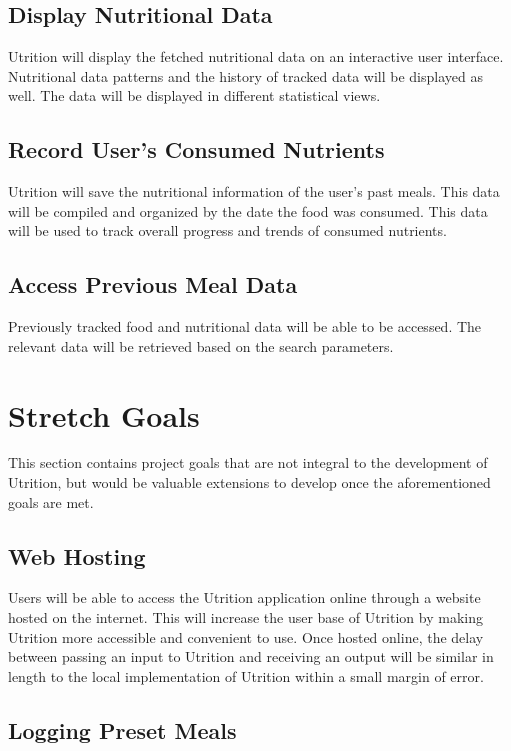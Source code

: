 \documentclass{article}
\begin{document}
\subsection{Display Nutritional Data}

Utrition will display the fetched nutritional data on an interactive user 
interface. Nutritional data patterns and the history of tracked data will be 
displayed as well. The data will be displayed in different statistical views.

\subsection{Record User's Consumed Nutrients}

Utrition will save the nutritional information of the user's past meals. This 
data will be compiled and organized by the date the food was consumed. This 
data will be used to track overall progress and trends of consumed nutrients.

\subsection{Access Previous Meal Data}

Previously tracked food and nutritional data will be able to be accessed. The 
relevant data will be retrieved based on the search parameters.

\section{Stretch Goals}

This section contains project goals that are not integral to the development of Utrition, but would be valuable extensions to develop once the aforementioned goals are met.

\subsection{Web Hosting}

Users will be able to access the Utrition application online through a website hosted on the internet. This will increase the user base of Utrition by making Utrition more accessible and convenient to use. Once hosted online, the delay between passing an input to Utrition and receiving an output will be similar in length to the local implementation of Utrition within a small margin of error.

\subsection{Logging Preset Meals}
\end{document}
